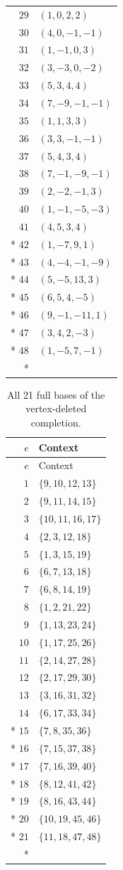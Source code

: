 \documentclass[aps,pra,reprint,superscriptaddress,longbibliography,nofootinbib,floatfix,10pt]{revtex4-2}
\theoremstyle{definition}
\begin{document}
\begin{longtable}{rl}
$29$ & $(1,0,2,2)$\\
$30$ & $(4,0,-1,-1)$\\
$31$ & $(1,-1,0,3)$\\
$32$ & $(3,-3,0,-2)$\\
$33$ & $(5,3,4,4)$\\
$34$ & $(7,-9,-1,-1)$\\
$35$ & $(1,1,3,3)$\\
$36$ & $(3,3,-1,-1)$\\
$37$ & $(5,4,3,4)$\\
$38$ & $(7,-1,-9,-1)$\\
$39$ & $(2,-2,-1,3)$\\
$40$ & $(1,-1,-5,-3)$\\
$41$ & $(4,5,3,4)$\\*
$42$ & $(1,-7,9,1)$\\*
$43$ & $(4,-4,-1,-9)$\\*
$44$ & $(5,-5,13,3)$\\*
$45$ & $(6,5,4,-5)$\\*
$46$ & $(9,-1,-11,1)$\\*
$47$ & $(3,4,2,-3)$\\*
$48$ & $(1,-5,7,-1)$\\*
\end{longtable}
\endgroup
\begingroup\small
{}
\begin{longtable}{rl}
\caption{All 21 full bases of the vertex-deleted completion.}\label{tab:cabello45-contexts}\\
\toprule
$e$ & Context\\\midrule
\endfirsthead
\toprule
$e$ & Context\\\midrule
\endhead
\bottomrule\endfoot
$1$ & $\{9,10,12,13\}$\\
$2$ & $\{9,11,14,15\}$\\
$3$ & $\{10,11,16,17\}$\\
$4$ & $\{2,3,12,18\}$\\
$5$ & $\{1,3,15,19\}$\\
$6$ & $\{6,7,13,18\}$\\
$7$ & $\{6,8,14,19\}$\\
$8$ & $\{1,2,21,22\}$\\
$9$ & $\{1,13,23,24\}$\\
$10$ & $\{1,17,25,26\}$\\
$11$ & $\{2,14,27,28\}$\\
$12$ & $\{2,17,29,30\}$\\
$13$ & $\{3,16,31,32\}$\\
$14$ & $\{6,17,33,34\}$\\*
$15$ & $\{7,8,35,36\}$\\*
$16$ & $\{7,15,37,38\}$\\*
$17$ & $\{7,16,39,40\}$\\*
$18$ & $\{8,12,41,42\}$\\*
$19$ & $\{8,16,43,44\}$\\*
$20$ & $\{10,19,45,46\}$\\*
$21$ & $\{11,18,47,48\}$\\*
\end{longtable}
\endgroup
\end{document}
